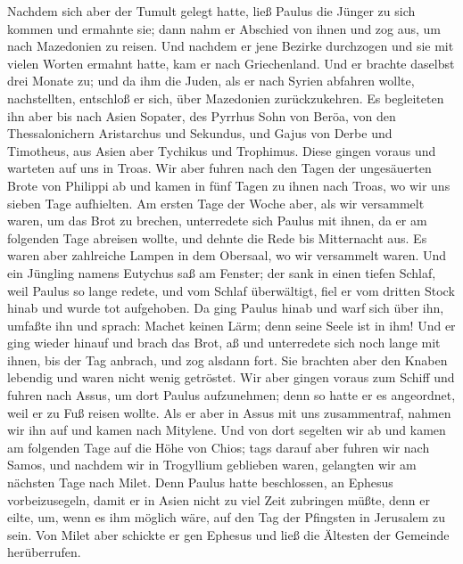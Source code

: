  Nachdem sich aber der Tumult gelegt hatte, ließ Paulus
die Jünger zu sich kommen und ermahnte sie; dann nahm er Abschied von
ihnen und zog aus, um nach Mazedonien zu reisen.  Und
nachdem er jene Bezirke durchzogen und sie mit vielen Worten ermahnt
hatte, kam er nach Griechenland.  Und er brachte daselbst
drei Monate zu; und da ihm die Juden, als er nach Syrien abfahren
wollte, nachstellten, entschloß er sich, über Mazedonien zurückzukehren.
 Es begleiteten ihn aber bis nach Asien Sopater, des
Pyrrhus Sohn von Beröa, von den Thessalonichern Aristarchus und
Sekundus, und Gajus von Derbe und Timotheus, aus Asien aber Tychikus und
Trophimus.  Diese gingen voraus und warteten auf uns in
Troas.  Wir aber fuhren nach den Tagen der ungesäuerten
Brote von Philippi ab und kamen in fünf Tagen zu ihnen nach Troas, wo
wir uns sieben Tage aufhielten.  Am ersten Tage der Woche
aber, als wir versammelt waren, um das Brot zu brechen, unterredete sich
Paulus mit ihnen, da er am folgenden Tage abreisen wollte, und dehnte
die Rede bis Mitternacht aus.  Es waren aber zahlreiche
Lampen in dem Obersaal, wo wir versammelt waren.  Und ein
Jüngling namens Eutychus saß am Fenster; der sank in einen tiefen
Schlaf, weil Paulus so lange redete, und vom Schlaf überwältigt, fiel er
vom dritten Stock hinab und wurde tot aufgehoben.  Da
ging Paulus hinab und warf sich über ihn, umfaßte ihn und sprach: Machet
keinen Lärm; denn seine Seele ist in ihm!  Und er ging
wieder hinauf und brach das Brot, aß und unterredete sich noch lange mit
ihnen, bis der Tag anbrach, und zog alsdann fort.  Sie
brachten aber den Knaben lebendig und waren nicht wenig getröstet.
 Wir aber gingen voraus zum Schiff und fuhren nach Assus,
um dort Paulus aufzunehmen; denn so hatte er es angeordnet, weil er zu
Fuß reisen wollte.  Als er aber in Assus mit uns
zusammentraf, nahmen wir ihn auf und kamen nach Mitylene.
 Und von dort segelten wir ab und kamen am folgenden Tage
auf die Höhe von Chios; tags darauf aber fuhren wir nach Samos, und
nachdem wir in Trogyllium geblieben waren, gelangten wir am nächsten
Tage nach Milet.  Denn Paulus hatte beschlossen, an
Ephesus vorbeizusegeln, damit er in Asien nicht zu viel Zeit zubringen
müßte, denn er eilte, um, wenn es ihm möglich wäre, auf den Tag der
Pfingsten in Jerusalem zu sein.  Von Milet aber schickte
er gen Ephesus und ließ die Ältesten der Gemeinde herüberrufen.
